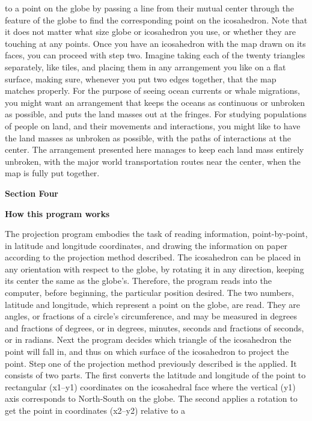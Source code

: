 to a point on the globe by passing a line from their
mutual center through the feature of the globe to find
the corresponding point on the icosahedron.  Note
that it does not matter what size globe or icosahedron
you use, or whether they are touching at any points.
\bigskip\flushpar
Once you have an icosahedron with the map drawn
on its faces, you can proceed with step two.
\bigskip\flushpar
Imagine taking each of the twenty triangles
separately, like tiles, and placing them in any
arrangement you like on a flat surface, making sure,
whenever you put two edges together, that the map
matches properly.  For the purpose of seeing ocean
currents or whale migrations, you might want an arrangement
that keeps the oceans as continuous or unbroken as
possible, and puts the land masses out at the fringes.
For studying populations of people on land, and their
movements and interactions, you might like to have
the land masses as unbroken as possible, with the paths
of interactions at the center.
\bigskip\flushpar
The arrangement presented here manages to keep
each land mass entirely unbroken, with the major world
transportation routes near the center, when the map
is fully put together.
\vfill\eject
\centerline{\bf Section Four}
\bigskip\centerline{\bf How this program works}
\bigskip\bigskip\flushpar
The projection program embodies the task of
reading information, point-by-point, in latitude
and longitude coordinates, and drawing the information
on paper according to the projection method described.
\bigskip\flushpar
The icosahedron can be placed in any orientation
with respect to the globe, by rotating it in any direction,
keeping its center the same as the globe's.  Therefore,
the program reads into the computer, before beginning,
the particular position desired.
\bigskip\flushpar
The two numbers, latitude and longitude, which
represent a point on the globe, are read.  They are
angles, or fractions of a circle's circumference, and
may be measured in degrees and fractions of degrees,
or in degrees, minutes, seconds and fractions of seconds,
or in radians.
\bigskip\flushpar
Next the program decides which triangle of the
icosahedron the point will fall in, and thus on which
surface of the icosahedron to project the point.
\bigskip\flushpar
Step one of the projection method previously
described is the applied.  It consists of two parts.
The first converts the latitude and longitude of the
point to rectangular (x1--y1) coordinates on the
icosahedral face where the vertical (y1) axis corresponds
to North-South on the globe.  The second applies a rotation
to get the point in coordinates (x2--y2) relative to a
